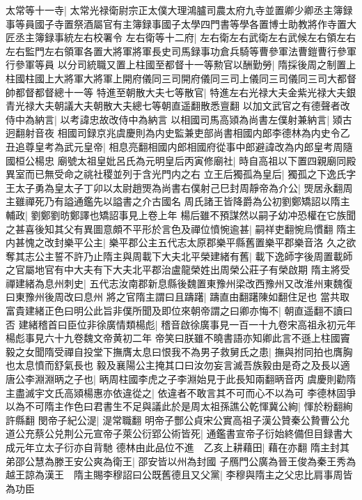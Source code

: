 太常等十一寺|{
	太常光禄衛尉宗正太僕大理鴻臚司農太府九寺並置卿少卿丞主簿録事等員國子寺置祭酒屬官有主簿録事國子太學四門書等學各置博士助教將作寺置大匠丞主簿録事統左右校署令}
左右衛等十二府|{
	左右衛左右武衛左右武候左右領左右左右監門左右領軍各置大將軍將軍長史司馬録事功倉兵騎等曹參軍法曹鎧曹行參軍行參軍等員}
以分司統職又置上柱國至都督十一等勲官以酬勤勞|{
	隋採後周之制置上柱國柱國上大將軍大將軍上開府儀同三司開府儀同三司上儀同三司儀同三司大都督帥都督都督總十一等}
特進至朝散大夫七等散官|{
	特進左右光禄大夫金紫光禄大夫銀青光禄大夫朝議大夫朝散大夫總七等朝直遥翻散悉亶翻}
以加文武官之有德聲者改侍中為納言|{
	以考諱忠故改侍中為納言}
以相國司馬高熲為尚書左僕射兼納言|{
	熲古迥翻射音夜}
相國司録京兆虞慶則為内史監兼吏部尚書相國内郎李德林為内史令乙丑追尊皇考為武元皇帝|{
	相息亮翻相國内郎相國府從事中郎避諱改為内郎皇考周隨國桓公楊忠}
廟號太祖皇妣呂氏為元明皇后丙寅修廟社|{
	時自高祖以下置四親廟同殿異室而已無受命之祧社稷並列于含光門内之右}
立王后獨孤為皇后|{
	獨孤之下逸氏字}
王太子勇為皇太子丁卯以太尉趙煚為尚書右僕射己巳封周靜帝為介公|{
	煚居永翻周主雖禪死乃有謚通鑑先以謚書之介古國名}
周氏諸王皆降爵為公初劉鄭矯詔以隋主輔政|{
	劉鄭劉昉鄭譯也矯詔事見上卷上年}
楊后雖不預謀然以嗣子幼冲恐權在它族聞之甚喜後知其父有異圖意頗不平形於言色及禪位憤惋逾甚|{
	嗣祥吏翻惋烏慣翻}
隋主内甚愧之改封樂平公主|{
	樂平郡公主五代志太原郡樂平縣舊置樂平郡樂音洛}
久之欲奪其志公主誓不許乃止隋主與周載下大夫北平榮建緒有舊|{
	載下逸師字後周置載師之官屬地官有中大夫有下大夫北平郡治盧龍榮姓出周榮公莊子有榮啟期}
隋主將受禪建緒為息州刺史|{
	五代志汝南郡新息縣後魏置東豫州梁改西豫州又改淮州東魏復曰東豫州後周改曰息州}
將之官隋主謂曰且躊躇|{
	躊直由翻躇陳如翻住足也}
當共取富貴建緒正色曰明公此旨非僕所聞及即位來朝帝謂之曰卿亦悔不|{
	朝直遥翻不讀曰否}
建緒稽首曰臣位非徐廣情類楊彪|{
	稽音啟徐廣事見一百一十九卷宋高祖永初元年楊彪事見六十九卷魏文帝黄初二年}
帝笑曰朕雖不曉書語亦知卿此言不遜上柱國竇毅之女聞隋受禪自投堂下撫膺太息曰恨我不為男子救舅氏之患|{
	撫與拊同拍也膺胸也太息憤而舒氣長也}
毅及襄陽公主掩其口曰汝勿妄言滅吾族毅由是奇之及長以適唐公李淵淵昞之子也|{
	昞周柱國李虎之子李淵始見于此長知兩翻昞音丙}
虞慶則勸隋主盡滅宇文氏高熲楊惠亦依違從之|{
	依違者不敢言其不可而心不以為可}
李德林固爭以為不可隋主作色曰君書生不足與議此於是周太祖孫譙公乾惲冀公絢|{
	惲於粉翻絢許縣翻}
閔帝子紀公湜|{
	湜常職翻}
明帝子酆公貞宋公實高祖子漢公贊秦公贄曹公允道公充蔡公兑荆公元宣帝子萊公衍郢公術皆死|{
	通鑑書宣帝子衍始終備但目録書大成元年立太子衍亦自背馳}
德林由此品位不進　乙亥上耕藉田|{
	藉在亦翻}
隋主封其弟邵公慧為滕王安公爽為衛王|{
	邵安皆以州為封國}
子鴈門公廣為晉王俊為秦王秀為越王諒為漢王　隋主賜李穆詔曰公既舊德且又父黨|{
	李穆與隋主之父忠比肩事周皆為功臣}

